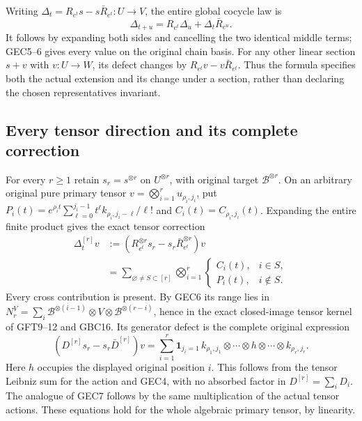 Writing $\Delta_t=R_{e^t}s-s\bar R_{e^t}:U\to V$, the entire
global cocycle law is
\begin{equation}\tag{GEC7}
 \Delta_{t+u}=R_{e^t}\Delta_u+\Delta_t\bar R_{e^u}.
\end{equation}
It follows by expanding both sides and cancelling the two
identical middle terms; GEC5--6 gives every value on the
original chain basis. For any other linear section $s+v$
with $v:U\to W$, its defect changes by
$R_{e^t}v-v\bar R_{e^t}$. Thus the formula specifies both
the actual extension and its change under a section, rather
than declaring the chosen representatives invariant.

\subsection{Every tensor direction and its complete correction}

For every $r\ge1$ retain $s_r=s^{\otimes r}$ on $U^{\otimes r}$,
with original target $\mathscr B^{\otimes r}$. On an arbitrary
original pure primary tensor $v=\bigotimes_{i=1}^r u_{\rho_i,j_i}$,
put
$P_i(t)=e^{\rho_i t}\sum_{\ell=0}^{j_i-1}
t^\ell k_{\rho_i,j_i-\ell}/\ell!$ and
$C_i(t)=C_{\rho_i,j_i}(t)$. Expanding the entire finite product
gives the exact tensor correction
\begin{equation}\tag{GEC8}
 \begin{split}
 \Delta_t^{[r]}v
 &:=(R_{e^t}^{\otimes r}s_r-s_r\bar R_{e^t}^{\otimes r})v\\
 &=\sum_{\varnothing\ne S\subset[r]}
          \bigotimes_{i=1}^r
          \begin{cases}C_i(t),&i\in S,\\P_i(t),&i\notin S.
          \end{cases}
 \end{split}
\end{equation}
Every cross contribution is present. By GEC6 its range lies in
$N_r^V=\sum_i\mathscr B^{\otimes(i-1)}\otimes V
\otimes\mathscr B^{\otimes(r-i)}$, hence in the exact
closed-image tensor kernel of GFT9--12 and GBC16.
Its generator defect is the complete original expression
\begin{equation}\tag{GEC9}
 (D^{[r]}s_r-s_r\bar D^{[r]})v
  =\sum_{i=1}^r\mathbf1_{j_i=1}\,
    k_{\rho_1,j_1}\otimes\cdots\otimes h
                       \otimes\cdots\otimes k_{\rho_r,j_r}.
\end{equation}
Here $h$ occupies the displayed original position $i$.
This follows from the tensor Leibniz sum for the action and
GEC4, with no absorbed factor in $D^{[r]}=\sum_iD_i$.
The analogue of GEC7 follows by the same multiplication of
the actual tensor actions. These equations hold for the
whole algebraic primary tensor, by linearity.

